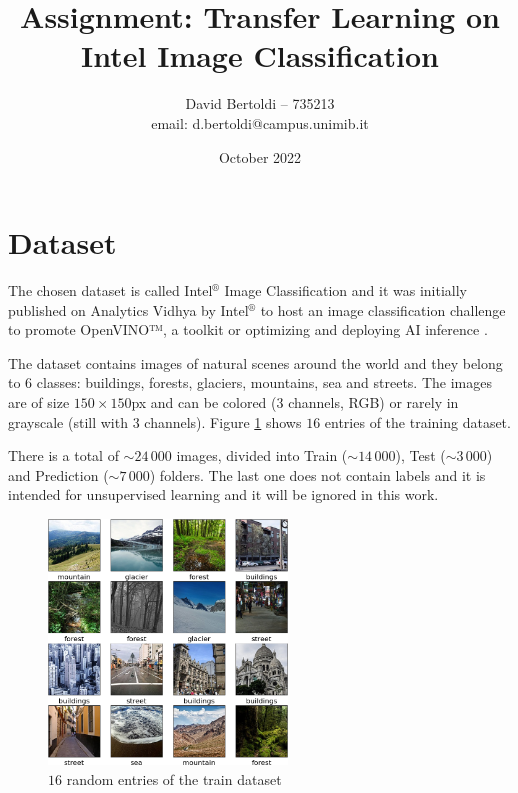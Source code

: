 \documentclass[compsoc]{IEEEtran}
\title{Assignment: Transfer Learning on Intel Image Classification}
\author{David Bertoldi -- 735213 \\ email: d.bertoldi@campus.unimib.it}
\affil{Department of Informatics, Systems and Communication}
\affil{University of Milano-Bicocca}
\date{October 2022}
\begin{document}
\maketitle 



\section{Dataset}\label{sec:insp}
The chosen dataset is called Intel$^\circledR$ Image Classification and it was initially published on Analytics Vidhya by Intel$^\circledR$ to host an image classification challenge to promote OpenVINO™, a toolkit or optimizing and deploying AI inference \cite{site1}\cite{site2}. \par

The dataset contains images of natural scenes around the world and they belong to $6$ classes: buildings, forests, glaciers, mountains, sea and streets. The images are of size $150\times150$px and can be colored ($3$ channels, RGB) or rarely in grayscale (still with $3$ channels). Figure \ref{fig:samples} shows $16$ entries of the training dataset. \par
There is a total of ${\sim 24\,000}$ images, divided into Train (${\sim14\,000}$), Test (${\sim3\,000}$) and Prediction (${\sim7\,000}$) folders. The last one does not contain labels and it is intended for unsupervised learning and it will be ignored in this work.



\begin{figure}[ht!]
\centering                                                                        
\includegraphics[width=2.5in]{../images/samples.png}
\captionsetup{justification=centering}                                                                                         
\caption{$16$ random entries of the train dataset}
\label{fig:samples}                                                                                                                               
\end{figure}
\end{document}
